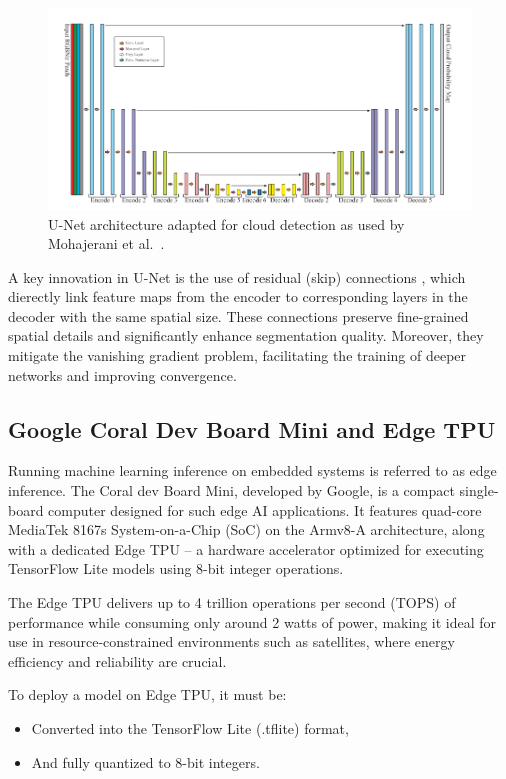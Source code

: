 {\begin{figure}[H]
  \centering
  \includegraphics[width=\textwidth]{files/U-Net_cloud_detection.png}
  \caption{U-Net architecture adapted for cloud detection as used by Mohajerani et al.~\cite{mohajerani2019cloudnet}.}
  \label{fig:unet-architecture}
\end{figure}


A key innovation in U-Net is the use of residual (skip) connections \cite{he2015deepresiduallearningimage}, which dierectly link feature maps from the encoder to corresponding layers in the decoder with the same spatial size. These connections preserve fine-grained spatial details and significantly enhance segmentation quality. Moreover, they mitigate the vanishing gradient problem, facilitating the training of deeper networks and improving convergence.

\subsection{Google Coral Dev Board Mini and Edge TPU}

Running machine learning inference on embedded systems is referred to as edge inference. The Coral dev Board Mini, developed by Google, is a compact single-board computer designed for such edge AI applications. It features quad-core MediaTek 8167s System-on-a-Chip (SoC) on the Armv8-A architecture, along with a dedicated Edge TPU – a hardware accelerator optimized for executing TensorFlow Lite models using 8-bit integer operations.

The Edge TPU delivers up to 4 trillion operations per second (TOPS) of performance while consuming only around 2 watts of power, making it ideal for use in resource-constrained environments such as satellites, where energy efficiency and reliability are crucial.

To deploy a model on Edge TPU, it must be:
\begin{itemize}
    \item Converted into the TensorFlow Lite (.tflite) format,
    \item And fully quantized to 8-bit integers.
\end{itemize}

}
